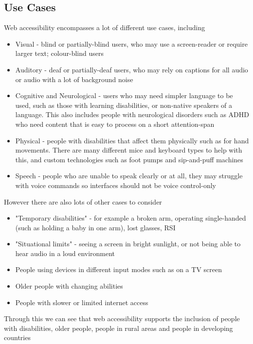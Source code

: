 \documentclass[ %
                    author={Aleena Baig},
                supervisor={Dr Simon Lock},
                    degree={BSc},
                     title={On Making Web Accessible Graphs},
                  subtitle={},
                      year={2019} ]{dissertation}
\begin{document}
\subsection{Use Cases}
%
Web accessibility encompasses a lot of different use cases, including
%
\begin{itemize}
    \item Visual - blind or partially-blind users, who may use a screen-reader or require larger text; colour-blind users
    \item Auditory - deaf or partially-deaf users, who may rely on captions for all audio or audio with a lot of background noise
    \item Cognitive and Neurological - users who may need simpler language to be used, such as those with learning disabilities, or non-native speakers of a language. This also includes people with neurological disorders such as ADHD who need content that is easy to process on a short attention-span
    \item Physical - people with disabilities that affect them physically such as for hand movements. There are many different mice and keyboard types to help with this, and custom technologies such as foot pumps and sip-and-puff machines
    \item Speech - people who are unable to speak clearly or at all, they may struggle with voice commands so interfaces should not be voice control-only
\end{itemize}


However there are also lots of other cases to consider \cite{WAIaccessibilityintro}
%
\begin{itemize}
    \item "Temporary disabilities" - for example a broken arm, operating single-handed (such as holding a baby in one arm), lost glasses, RSI
    \item "Situational limits" - seeing a screen in bright sunlight, or not being able to hear audio in a loud environment
    \item People using devices in different input modes such as on a TV screen
    \item Older people with changing abilities
    \item People with slower or limited internet access
\end{itemize}

Through this we can see that web accessibility supports the inclusion of people with disabilities, older people, people in rural areas and people in developing countries
\end{document}
